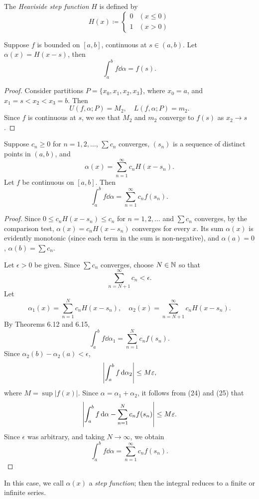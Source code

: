 \begin{example}
The \emph{Heaviside step function} $H$ is defined by
\[H(x)\coloneqq\begin{cases}
0&(x\le0)\\
1&(x>0)
\end{cases}\]

\begin{proposition*}
Suppose $f$ is bounded on $[a,b]$, continuous at $s\in(a,b)$. Let $\alpha(x)=H(x-s)$, then
\[\int_a^b f\dd{\alpha}=f(s).\]
\end{proposition*}

\begin{proof}
Consider partitions $P=\{x_0,x_1,x_2,x_3\}$, where $x_0=a$, and $x_1=s<x_2<x_3=b$. Then
\[U(f,\alpha;P)=M_2,\quad L(f,\alpha;P)=m_2.\]
Since $f$ is continuous at $s$, we see that $M_2$ and $m_2$ converge to $f(s)$ as $x_2\to s$.
\end{proof}

\begin{proposition*}
Suppose $c_n\ge0$ for $n=1,2,\dots$, $\sum c_n$ converges, $(s_n)$ is a sequence of distinct points in $(a,b)$, and
\[\alpha(x)=\sum_{n=1}^{\infty}c_n H(x-s_n).\]
Let $f$ be continuous on $[a,b]$. Then
\[\int_a^b f\dd{\alpha}=\sum_{n=1}^{\infty}c_n f(s_n).\]
\end{proposition*}

\begin{proof}
Since $0\le c_n H(x-s_n)\le c_n$ for $n=1,2,\dots$ and $\sum c_n$ converges, by the comparison test, $\alpha(x)=c_n H(x-s_n)$ converges for every $x$. Its sum $\alpha(x)$ is evidently monotonic (since each term in the sum is non-negative), and $\alpha(a)=0$, $\alpha(b)=\sum c_n$.

Let $\epsilon>0$ be given. Since $\sum c_n$ converges, choose $N\in\mathbb N$ so that 
\[\sum_{n=N+1}^{\infty}c_n<\epsilon.\]
Let
\[\alpha_1(x)=\sum_{n=1}^{N}c_n H(x-s_n),\quad\alpha_2(x)=\sum_{n=N+1}^{\infty}c_n H(x-s_n).\]
By Theorems 6.12 and 6.15,
\[\int_{a}^{b}f\dd{\alpha_1}=\sum_{n=1}^{N}c_n f(s_n).\]
Since $\alpha_2(b)-\alpha_2(a)<\epsilon$,
\[\left|\int_{a}^{b}f\dd{\alpha_2}\right|\le M\varepsilon,\]
where $M=\sup|f(x)|$. Since $\alpha=\alpha_1+\alpha_2$, it follows from (24) and (25) that
\[\left|\int_{a}^{b}f\dd{\alpha}-\sum_{n=1}^{N}c_n f(s_n)\right|\le M\varepsilon.\]
Since $\epsilon$ was arbitrary, and taking $N\to\infty$, we obtain
\[\int_a^b f\dd{\alpha}=\sum_{n=1}^{\infty}c_n f(s_n).\]
\end{proof}
In this case, we call $\alpha(x)$ a \emph{step function}; then the integral reduces to a finite or infinite series.
\end{example}

